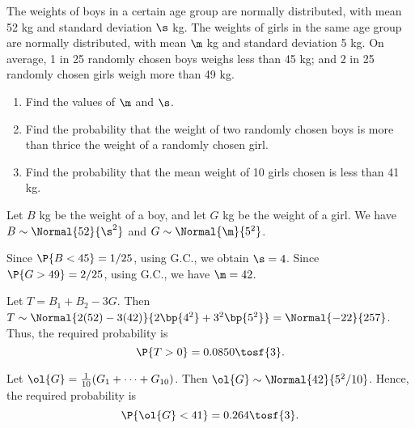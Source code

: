 \begin{problem}
    The weights of boys in a certain age group are normally distributed, with mean 52 kg and standard deviation $\s$ kg. The weights of girls in the same age group are normally distributed, with mean $\m$ kg and standard deviation 5 kg. On average, 1 in 25 randomly chosen boys weighs less than 45 kg; and 2 in 25 randomly chosen girls weigh more than 49 kg.

    \begin{enumerate}
        \item Find the values of $\m$ and $\s$.
        \item Find the probability that the weight of two randomly chosen boys is more than thrice the weight of a randomly chosen girl.
        \item Find the probability that the mean weight of 10 girls chosen is less than 41 kg.
    \end{enumerate}
\end{problem}
\begin{solution}
    Let $B$ kg be the weight of a boy, and let $G$ kg be the weight of a girl. We have $B \sim \Normal{52}{\s^2}$ and $G \sim \Normal{\m}{5^2}$.

    \begin{ppart}
        Since $\P{B < 45} = 1/25$, using G.C., we obtain $\s = 4$. Since $\P{G > 49} = 2/25$, using G.C., we have $\m = 42$.
    \end{ppart}
    \begin{ppart}
        Let $T = B_1 + B_2 - 3G$. Then $T \sim \Normal{2(52) - 3(42)}{2\bp{4^2} + 3^2 \bp{5^2}} = \Normal{-22}{257}$. Thus, the required probability is \[\P{T > 0} = 0.0850 \tosf{3}.\]
    \end{ppart}
    \begin{ppart}
        Let $\ol{G} = \frac1{10} (G_1 + \dots + G_{10})$. Then $\ol{G} \sim \Normal{42}{5^2/10}$. Hence, the required probability is \[\P{\ol{G} < 41} = 0.264 \tosf{3}.\]
    \end{ppart}
\end{solution}